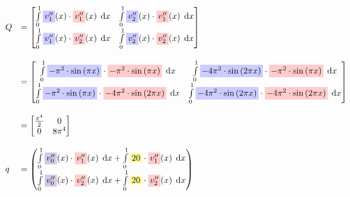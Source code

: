 \documentclass[
final,
a4paper,
oneside,
parskip=full,
headings=standardclasses,
headings=big,
pointednumbers,
fleqn
]{scrartcl}
\newcommand{\tfillb}[1]{\tfillc[#1][blue!20]}
\newcommand{\tfilly}[1]{\tfillc[#1][yellow!40]}
\newcommand{\tfillr}[1]{\tfillc[#1][red!20]}
\newcommand{\tfillv}[1]{\tfillc[#1][Violet!20]}
\newcommand*\difx{\; \mathop{}\!\mathrm{d}x}
\newcommand{\f}[2]{\frac{#1}{#2}}
\newcommand{\kl}[1]{{\left( #1 \right)}}
\begin{document}
    {\setlength{\abovedisplayskip}{-6pt}
    \setlength{\belowdisplayskip}{-12pt}
    \begin{align*}
        \begin{array}{ll}
            Q & = \begin{bmatrix}
                \int\limits_{0}^{1}{\tfillb{$v_1''$}\kl{x} \cdot \tfillr{$v_1''$}\kl{x} \difx} &
                \int\limits_{0}^{1}{\tfillb{$v_2''$}\kl{x} \cdot \tfillr{$v_1''$}\kl{x} \difx} \\
                \int\limits_{0}^{1}{\tfillb{$v_1''$}\kl{x} \cdot \tfillr{$v_2''$}\kl{x} \difx} & 
                \int\limits_{0}^{1}{\tfillb{$v_2''$}\kl{x} \cdot \tfillr{$v_2''$}\kl{x} \difx} \\
            \end{bmatrix} \\
            & \\
            & = \begin{bmatrix}
                \int\limits_{0}^{1}{\tfillb{$-\pi^2 \cdot \sin\kl{\pi x}$}     \cdot \tfillr{$-\pi^2 \cdot \sin\kl{\pi x}$} \difx} &
                \int\limits_{0}^{1}{\tfillb{$-4 \pi^2 \cdot \sin\kl{2 \pi x}$} \cdot \tfillr{$-\pi^2 \cdot \sin\kl{\pi x}$} \difx} \\
                \int\limits_{0}^{1}{\tfillb{$-\pi^2 \cdot \sin\kl{\pi x}$}     \cdot \tfillr{$-4 \pi^2 \cdot \sin\kl{2 \pi x}$} \difx} & 
                \int\limits_{0}^{1}{\tfillb{$-4 \pi^2 \cdot \sin\kl{2 \pi x}$} \cdot \tfillr{$-4 \pi^2 \cdot \sin\kl{2 \pi x}$} \difx} \\
            \end{bmatrix} \\
            & \\
            & = \begin{bmatrix}
                \f{\pi^4}{2} & 0 \\
                0             & 8\pi^4
            \end{bmatrix} \\
            & \\
            q & = \begin{pmatrix}
                \int\limits_{0}^{1}{\tfillv{$v_0''$}\kl{x} \cdot \tfillr{$v_1''$}\kl{x} \difx} +
                \int\limits_{0}^{1}{\tfilly{$20$}          \cdot \tfillr{$v_1''$}\kl{x} \difx} \\
                \int\limits_{0}^{1}{\tfillv{$v_0''$}\kl{x} \cdot \tfillr{$v_2''$}\kl{x} \difx} +
                \int\limits_{0}^{1}{\tfilly{$20$}          \cdot \tfillr{$v_2''$}\kl{x} \difx}

\end{pmatrix}
\end{array}
\end{align*}}
\end{document}

